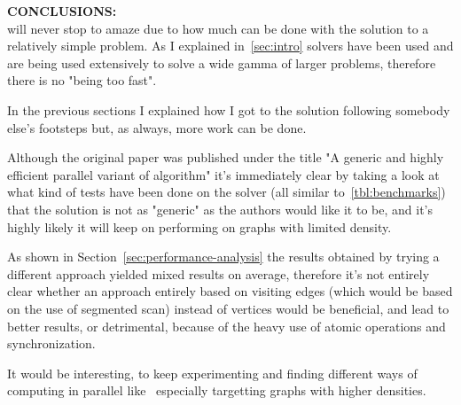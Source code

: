 \documentclass[a4paper,10pt]{article}
\begin{document}
\bigskip
{}
\makeatletter{}\makeatother\label{sec:final-thoughts}
\noindent
\textbf{CONCLUSIONS:}
\\
\mstp will never stop to amaze due to how much can be done with the solution to a relatively simple problem. As I explained in~\ref{sec:intro} \mstp solvers have been used and are being used extensively to solve a wide gamma of larger problems, therefore there is no "being too fast".

In the previous sections I explained how I got to the solution following somebody else's footsteps but, as always, more work can be done.

Although the original paper was published under the title "A generic and highly efficient parallel variant of \brkas algorithm" it's immediately clear by taking a look at what kind of tests have been done on the solver (all similar to~\ref{tbl:benchmarks}) that the solution is not as "generic" as the authors would like it to be, and it's highly likely it will keep on performing on graphs with limited density.

As shown in Section~\ref{sec:performance-analysis} the results obtained by trying a different
approach yielded mixed results on average, therefore it's not entirely clear whether an approach
entirely based on visiting edges (which would be based on the use of segmented scan) instead of vertices would be beneficial, and lead to better results, or detrimental, because of the heavy use of atomic operations and synchronization.

It would be interesting, to keep experimenting and finding different ways of computing \mst in
parallel like~\cite{mst-bipartite} especially targetting graphs with higher densities.

\clearpage

\printbibliography
\end{document}
